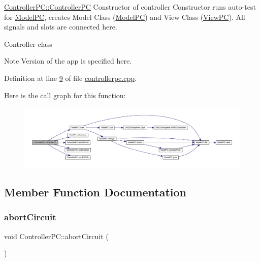 \mbox{\hyperlink{class_controller_p_c_afa6c92d67bf3b6531c42385fc5938003}{Controller\+P\+C\+::\+Controller\+PC}} Constructor of controller Constructor runs auto-\/test for \mbox{\hyperlink{class_model_p_c}{Model\+PC}}, creates Model Class (\mbox{\hyperlink{class_model_p_c}{Model\+PC}}) and View Class (\mbox{\hyperlink{class_view_p_c}{View\+PC}}). All signals and slots are connected here. 

Controller class \begin{DoxyNote}{Note}
Version of the app is specified here. 
\end{DoxyNote}


Definition at line \mbox{\hyperlink{controllerpc_8cpp_source_l00009}{9}} of file \mbox{\hyperlink{controllerpc_8cpp_source}{controllerpc.\+cpp}}.

Here is the call graph for this function\+:
\nopagebreak
\begin{figure}[H]
\begin{center}
\leavevmode
\includegraphics[width=350pt]{class_controller_p_c_afa6c92d67bf3b6531c42385fc5938003_cgraph}
\end{center}
\end{figure}


\subsection{Member Function Documentation}
\mbox{\label{class_controller_p_c_a8814989f7be1214e06b2e720889066b0}} 
\subsubsection{\texorpdfstring{abort\+Circuit}{abortCircuit}}
{\footnotesize\ttfamily void Controller\+P\+C\+::abort\+Circuit (\begin{DoxyParamCaption}{ }\end{DoxyParamCaption})\hspace{0.3cm}{\ttfamily [slot]}}



